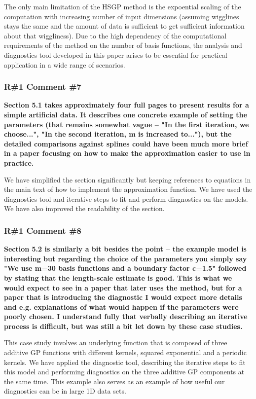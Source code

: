 \documentclass[11pt]{report}
\begin{document}
The only main limitation of the HSGP method is the expoential scaling of the computation with increasing number of input dimensions (assuming wigglines stays the same and the amount of data is sufficient to get sufficient information about that wiggliness). 
Due to the high dependency of the computational requirements of the method on the number of basis functions, the analysis and diagnostics tool developed in this paper arises to be essential for practical application in a wide range of scenarios. 

\subsubsection*{R\#1 Comment \#7}

\textbf{Section 5.1 takes approximately four full pages to present results for a simple artificial data. It describes one concrete example of setting the parameters (that remains somewhat vague -- "In the first iteration, we choose...", "In the second iteration, m is increased to..."), but the detailed comparisons against splines could have been much more brief in a paper focusing on how to make the approximation easier to use in practice.}

We have simplified the section significantly but keeping references to equations in the main text of how to implement the approximation function. We have used the diagnostics tool and iterative steps to fit and perform diagnostics on the models. We have also improved the readability of the section.

\subsubsection*{R\#1 Comment \#8}

\textbf{Section 5.2 is similarly a bit besides the point -- the example model is interesting but regarding the choice of the parameters you simply say "We use m=30 basis functions and a boundary factor c=1.5" followed by stating that the length-scale estimate is good. This is what we would expect to see in a paper that later uses the method, but for a paper that is introducing the diagnostic I would expect more details and e.g. explanations of what would happen if the parameters were poorly chosen. I understand fully that verbally describing an iterative process is difficult, but was still a bit let down by these case studies.}

This case study involves an underlying function that is composed of three additive GP functions with different kernels, squared exponential and a periodic kernels. We have applied the diagnostic tool, describing the iterative steps to fit this model and performing diagnostics on the three additive GP components at the same time. This example also serves as an example of how useful our diagnostics can be in large 1D data sets.
\end{document}
